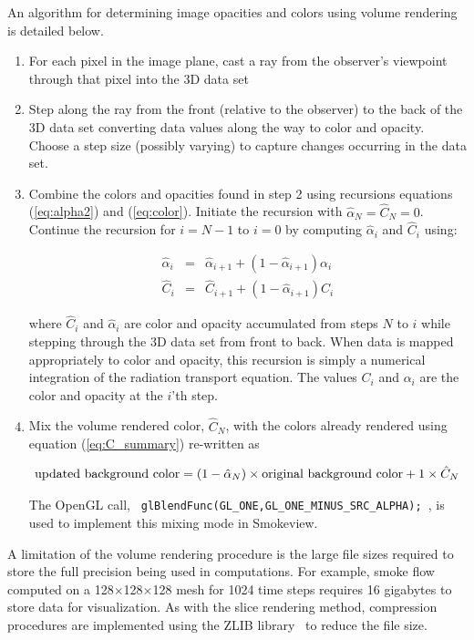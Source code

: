 {An algorithm for determining image opacities and colors using
volume rendering is detailed below.

\begin{enumerate}

\item For each pixel in the image plane, cast a ray from the
observer's viewpoint through that pixel into the 3D data set

\item Step along the ray from the front (relative to the observer)
to the back of the 3D data set converting data values along the
way to color and opacity.  Choose a step size (possibly varying)
to capture changes occurring in the data set.

\item Combine the colors and opacities found in step 2 using
recursions equations (\ref{eq:alpha2}) and (\ref{eq:color}).
Initiate the recursion with $\hat{\alpha}_{N}=\hat{C}_{N}=0$.
Continue the recursion for $i=N-1$ to $i=0$ by computing
$\hat{\alpha}_i$ and $\hat{C}_i$ using:

\begin{eqnarray}
\hat{\alpha}_i&=&\hat{\alpha}_{i+1}+\left(1-\hat{\alpha}_{i+1}\right)\alpha_i\\
\hat{C}_i&=&\hat{C}_{i+1}+\left(1-\hat{\alpha}_{i+1}\right)C_i
\end{eqnarray}

where $\hat{C}_i$ and $\hat{\alpha}_i$ are color and opacity
accumulated from steps $N$ to $i$ while stepping through the 3D
data set from front to back.  When data is mapped appropriately to
color and opacity, this recursion is simply a numerical
integration of the radiation transport equation. The values $C_i$
and $\alpha_i$ are the color and opacity at the $i$'th step.

\item Mix the volume rendered color, $\hat{C}_N$, with the colors
already rendered using equation (\ref{eq:C_summary}) re-written as

\begin{eqnarray}
\noindent\mbox{updated background color} =
(1-\hat{\alpha}_N)\times \mbox{original background color} +
1\times\hat{C}_N
\end{eqnarray}

The OpenGL call, {\tt
glBlendFunc(GL\_ONE,GL\_ONE\_MINUS\_SRC\_ALPHA); }, is used to
implement this mixing mode in Smokeview.
\end{enumerate}

A limitation of the volume rendering procedure is the large file
sizes required to store the full precision being used in
computations. For example, smoke flow computed on a
128$\times$128$\times$128 mesh for 1024 time steps requires 16
gigabytes to store data for visualization. As with the slice
rendering method, compression procedures are implemented using the
ZLIB library~\cite{ZLIB} to reduce the file size.


}

